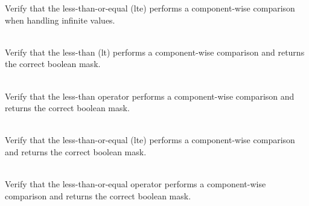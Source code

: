 \begin{DoxyRefList}
\label{test__test000064}%
%
Verify that the  less-\/than-\/or-\/equal (lte) performs a component-\/wise comparison when handling infinite values.  
\item[{\parbox[t]{\linewidth}{Member \doxylink{group___f_g_m___vec4___l_t___comp_ga771a3b2d2bbf2b7ceb8af9609b07bc31}{Vector4\+DComparison\+\_\+\+Less\+Than\+\_\+\+Returns\+Boolean\+Vector\+With\+Elements\+Less\+Than\+As\+True} ()}}]\hfill \\
\label{test__test000055}%
%
Verify that the  less-\/than (lt) performs a component-\/wise comparison and returns the correct boolean mask.  
\item[{\parbox[t]{\linewidth}{Member \doxylink{group___f_g_m___vec4___l_t___comp_ga2fc22660d0473420c9f0f771681ec232}{Vector4\+DComparison\+\_\+\+Less\+Than\+Operator\+\_\+\+Returns\+Boolean\+Vector\+With\+Elements\+Less\+Than\+As\+True} ()}}]\hfill \\
\label{test__test000056}%
%
Verify that the  less-\/than operator performs a component-\/wise comparison and returns the correct boolean mask.  
\item[{\parbox[t]{\linewidth}{Member \doxylink{group___f_g_m___vec4___l_t_e___comp_ga2e2e5a805eb80f6722810a2d5b611e15}{Vector4\+DComparison\+\_\+\+Less\+Than\+Or\+Equal\+\_\+\+Returns\+Boolean\+Vector\+With\+Elements\+Less\+Than\+Or\+Equal\+As\+True} ()}}]\hfill \\
\label{test__test000061}%
%
Verify that the  less-\/than-\/or-\/equal (lte) performs a component-\/wise comparison and returns the correct boolean mask.  
\item[{\parbox[t]{\linewidth}{Member \doxylink{group___f_g_m___vec4___l_t_e___comp_ga9c2535b935f8626b207d20be6c414701}{Vector4\+DComparison\+\_\+\+Less\+Than\+Or\+Equal\+Operator\+\_\+\+Returns\+Boolean\+Vector\+With\+Elements\+Less\+Than\+Or\+Equal\+As\+True} ()}}]\hfill \\
\label{test__test000062}%
%
Verify that the  less-\/than-\/or-\/equal operator performs a component-\/wise comparison and returns the correct boolean mask.  
\item[{\parbox[t]{\linewidth}{Member \doxylink{group___f_g_m___vec4___g_t___comp_ga01af216d9cd55739cb9eb63221a8f516}{Vector4\+DComparison\+\_\+\+Mixed\+Type\+\_\+\+Greater\+Than\+\_\+\+Returns\+Boolean\+Vector\+With\+Correct\+Values} ()}}]\hfill \\

\end{DoxyRefList}
